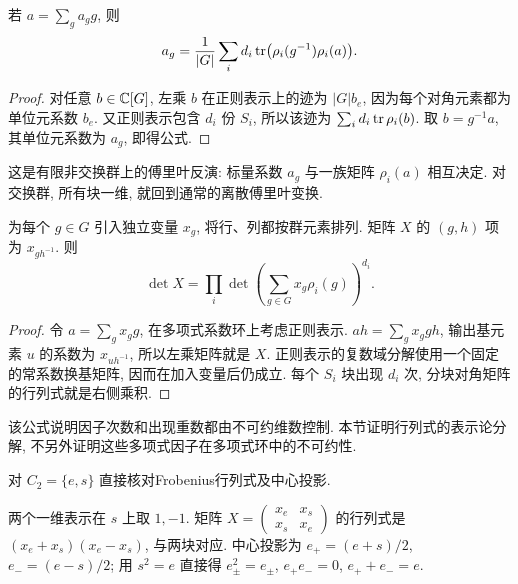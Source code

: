 \begin{proposition}
若 $a=\sum_g a_g g$, 则
\[
 a_g=\frac1{|G|}\sum_i d_i\operatorname{tr}\bigl(\rho_i(g^{-1})\rho_i(a)\bigr).
\]
\end{proposition}
\begin{proof}
对任意 $b\in\mathbb C[G]$, 左乘 $b$ 在正则表示上的迹为 $|G|b_e$, 因为每个对角元素都为单位元系数 $b_e$. 又正则表示包含 $d_i$ 份 $S_i$, 所以该迹为 $\sum_i d_i\operatorname{tr}\rho_i(b)$. 取 $b=g^{-1}a$, 其单位元系数为 $a_g$, 即得公式.
\end{proof}
这是有限非交换群上的傅里叶反演: 标量系数 $a_g$ 与一族矩阵 $\rho_i(a)$ 相互决定. 对交换群, 所有块一维, 就回到通常的离散傅里叶变换.

\begin{theorem}\label{thm:frobdet}
为每个 $g\in G$ 引入独立变量 $x_g$, 将行、列都按群元素排列. 矩阵 $X$ 的 $(g,h)$ 项为 $x_{gh^{-1}}$. 则
\[
 \det X=\prod_i\det\left(\sum_{g\in G}x_g\rho_i(g)\right)^{d_i}.
\]
\end{theorem}
\begin{proof}
令 $a=\sum_g x_g g$, 在多项式系数环上考虑正则表示. $a h=\sum_g x_g gh$, 输出基元素 $u$ 的系数为 $x_{uh^{-1}}$, 所以左乘矩阵就是 $X$. 正则表示的复数域分解使用一个固定的常系数换基矩阵, 因而在加入变量后仍成立. 每个 $S_i$ 块出现 $d_i$ 次, 分块对角矩阵的行列式就是右侧乘积.
\end{proof}
该公式说明因子次数和出现重数都由不可约维数控制. 本节证明行列式的表示论分解, 不另外证明这些多项式因子在多项式环中的不可约性.

\begin{exercise}
对 $C_2=\{e,s\}$ 直接核对Frobenius行列式及中心投影.
\end{exercise}
\begin{solution}
两个一维表示在 $s$ 上取 $1,-1$. 矩阵 $X=\begin{pmatrix}x_e&x_s\\x_s&x_e\end{pmatrix}$ 的行列式是 $(x_e+x_s)(x_e-x_s)$, 与两块对应. 中心投影为 $e_+=(e+s)/2$, $e_-=(e-s)/2$; 用 $s^2=e$ 直接得 $e_\pm^2=e_\pm$, $e_+e_-=0$, $e_++e_-=e$.
\end{solution}
